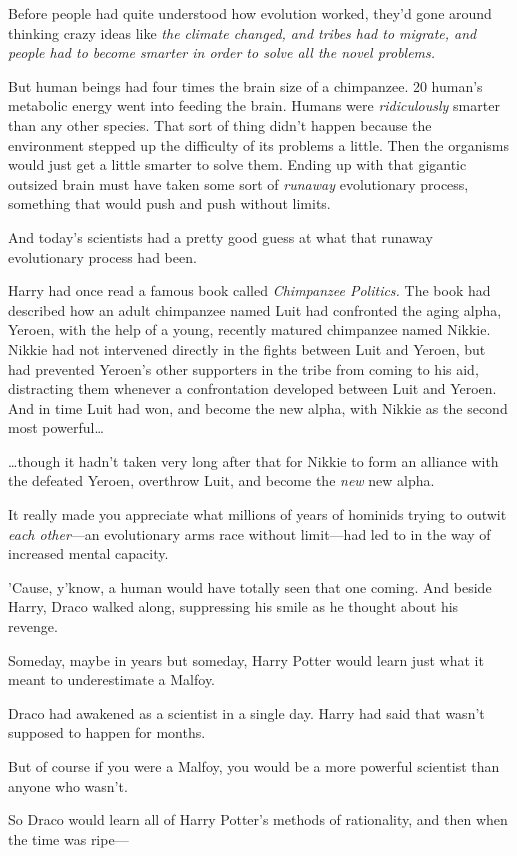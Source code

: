 Before people had quite understood how evolution worked, they'd gone around 
thinking crazy ideas like \emph{the climate changed, and tribes had to migrate, 
and people had to become smarter in order to solve all the novel problems.}

But human beings had four times the brain size of a chimpanzee. 20%
human's metabolic energy went into feeding the brain. Humans were 
\emph{ridiculously} smarter than any other species. That sort of thing didn't 
happen because the environment stepped up the difficulty of its problems a 
little. Then the organisms would just get a little smarter to solve them. 
Ending up with that gigantic outsized brain must have taken some sort of 
\emph{runaway} evolutionary process, something that would push and push without 
limits.

And today's scientists had a pretty good guess at what that runaway 
evolutionary process had been.

Harry had once read a famous book called \emph{Chimpanzee Politics.} The book 
had described how an adult chimpanzee named Luit had confronted the aging 
alpha, Yeroen, with the help of a young, recently matured chimpanzee named 
Nikkie. Nikkie had not intervened directly in the fights between Luit and 
Yeroen, but had prevented Yeroen's other supporters in the tribe from coming to 
his aid, distracting them whenever a confrontation developed between Luit and 
Yeroen. And in time Luit had won, and become the new alpha, with Nikkie as the 
second most powerful{\ldots}

{\ldots}though it hadn't taken very long after that for Nikkie to form an 
alliance with the defeated Yeroen, overthrow Luit, and become the \emph{new} 
new alpha.

It really made you appreciate what millions of years of hominids trying to 
outwit \emph{each other}---an evolutionary arms race without limit---had led to 
in the way of increased mental capacity.

'Cause, y'know, a human would have totally seen that one coming.
\sbreak
And beside Harry, Draco walked along, suppressing his smile as he thought about 
his revenge.

Someday, maybe in years but someday, Harry Potter would learn just what it 
meant to underestimate a Malfoy.

Draco had awakened as a scientist in a single day. Harry had said that wasn't 
supposed to happen for months.

But of course if you were a Malfoy, you would be a more powerful scientist than 
anyone who wasn't.

So Draco would learn all of Harry Potter's methods of rationality, and then 
when the time was ripe---